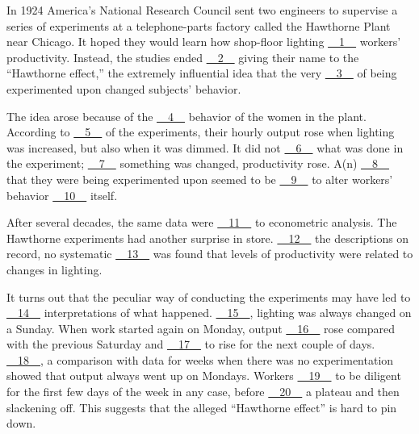 In 1924 America's National Research Council sent two engineers to supervise a series of experiments at a telephone-parts factory called the Hawthorne Plant near Chicago. It hoped they would learn how shop-floor lighting \uline{~~1~~} workers' productivity. Instead, the studies ended \uline{~~2~~} giving their name to the ``Hawthorne effect,'' the extremely influential idea that the very \uline{~~3~~} of being experimented  upon changed subjects' behavior.


The idea arose because of the \uline{~~4~~} behavior of the women in the plant. According to \uline{~~5~~} of the experiments, their hourly output rose when lighting was increased, but also when it was dimmed. It did not \uline{~~6~~} what was done in  the experiment; \uline{~~7~~} something was changed, productivity rose. A(n) \uline{~~8~~} that they were being experimented upon seemed to be \uline{~~9~~} to alter workers' behavior \uline{~~10~~} itself.


After several decades, the same data were \uline{~~11~~} to econometric analysis. The Hawthorne experiments had another surprise in store. \uline{~~12~~} the descriptions on  record, no systematic \uline{~~13~~} was found that levels of productivity were related to changes in lighting.


It turns out that the peculiar way of conducting the experiments may have led to \uline{~~14~~} interpretations of what happened. \uline{~~15~~}, lighting was always changed on a Sunday. When work started again on Monday, output \uline{~~16~~} rose compared with the previous Saturday and \uline{~~17~~} to rise for the next couple of days. \uline{~~18~~}, a comparison with data for weeks when there was no experimentation showed that output always went up on Mondays. Workers \uline{~~19~~} to be diligent for the first few days of the week in any case, before \uline{~~20~~} a plateau and then slackening off. This suggests that the alleged ``Hawthorne effect'' is hard to pin down.